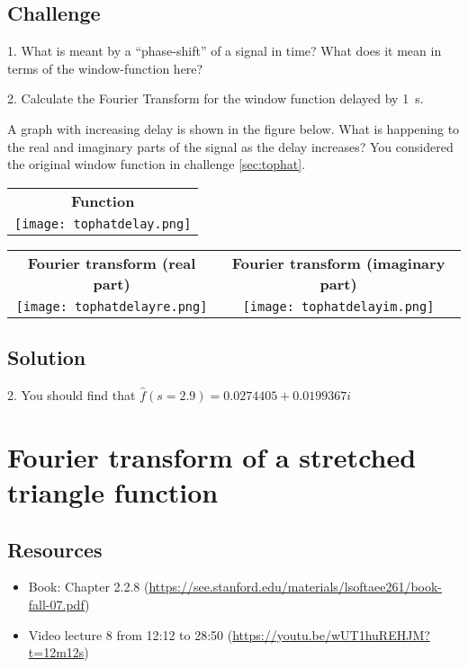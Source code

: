 \subsection*{Challenge}
1. What is meant by a ``phase-shift'' of a signal in time? What does it mean in terms of the window-function here?

2. Calculate the Fourier Transform for the window function delayed by \SI{1}{\second}.

A graph with increasing delay is shown in the figure below. What is happening to the real and imaginary parts of the signal as the delay increases? You considered the original window function in challenge \ref{sec:tophat}.

\begin{tabular}{c}
    \textbf{Function} \\
    \texttt{[image: tophatdelay.png]}
\end{tabular}

\begin{tabular}{cc}
    \textbf{Fourier transform (real part)} & \textbf{Fourier transform (imaginary part)}\\
    \texttt{[image: tophatdelayre.png]} & \texttt{[image: tophatdelayim.png]}
\end{tabular}

\subsection*{Solution}
2. You should find that $\hat{f}(s=2.9) = 0.0274405 + 0.0199367i$




\newpage
\section{Fourier transform of a stretched triangle function}

\subsection*{Resources}
\begin{itemize}
    \item Book: Chapter 2.2.8 (\url{https://see.stanford.edu/materials/lsoftaee261/book-fall-07.pdf})
    \item Video lecture 8 from 12:12 to 28:50 (\url{https://youtu.be/wUT1huREHJM?t=12m12s})
\end{itemize}

